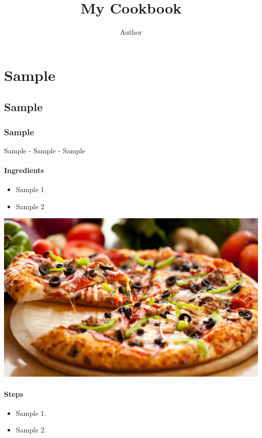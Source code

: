 \documentclass[12pt,a4paper,oneside]{book}
\begin{document}
\title{{\myfont My Cookbook}}
\author{{\Huge Author}}
\maketitle
\tableofcontents
\newpage

\part{Sample}
\chapter{Sample}

\newpage
\section{Sample}
\begin{center} \large Sample - Sample - Sample \end{center}
\subsection{Ingredients} 
\begin{minipage}{0.5\textwidth} 
\begin{itemize}
\item Sample 1
\item Sample 2
\end{itemize}
\end{minipage}
\begin{minipage}{0.5\textwidth}
\includegraphics[width=0.9\linewidth]{pictures/c5dd1b2697720fe692c529688d3f4f8d.jpg}
\end{minipage}
\linespread{1.25}
\subsection{Steps}
\begin{itemize}
\item Sample 1.
\item Sample 2.
\end{itemize}
\end{document}
